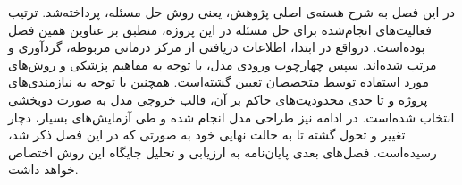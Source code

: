 
در این فصل به شرح هسته‌ی اصلی پژوهش، یعنی روش حل مسئله، پرداخته‌شد.
ترتیب فعالیت‌های انجام‌شده برای حل مسئله در این پروژه، منطبق بر عناوین همین فصل بوده‌است.
درواقع در ابتدا، اطلاعات دریافتی از مرکز درمانی مربوطه، گرد‌آوری و مرتب شده‌اند.
سپس چهارچوب ورودی مدل، با توجه به مفاهیم پزشکی و روش‌های مورد استفاده توسط متخصصان تعیین گشته‌است.
همچنین با توجه به نیازمندی‌های پروژه و تا حدی محدودیت‌های حاکم بر آن، قالب خروجی مدل به صورت دوبخشی انتخاب شده‌است.
در ادامه نیز
طراحی مدل انجام شده و طی آزمایش‌های بسیار، دچار تغییر و تحول گشته تا به حالت نهایی خود به صورتی که در این فصل ذکر شد، رسیده‌است.
فصل‌های بعدی پایان‌نامه به ارزیابی و تحلیل جایگاه این روش اختصاص خواهد داشت.